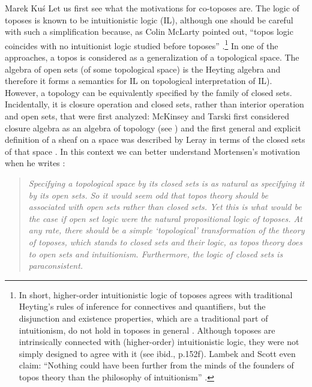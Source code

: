\begin{artengenv}{Marek Ku\'s}
Let us first see what the motivations for co-toposes are. The logic of toposes is known to be intuitionistic logic (\textsf{IL}), although one should be careful with such a simplification because, as Colin McLarty pointed out, ``topos logic coincides with no intuitionist logic studied before toposes''  \parencite[see][p.vii]{mclarty-1995}.\footnote{In short, higher-order intuitionistic logic of toposes agrees with traditional Heyting's rules of inference for connectives and quantifiers, but the disjunction and existence properties, which are a traditional part of intuitionism, do not hold in toposes in general \parencite[see][p.154]{mclarty-review-1990}. Although toposes are intrinsically connected with (higher-order) intuitionistic logic, they were not simply designed to agree with it (see ibid., p.152f). Lambek and Scott even claim: ``Nothing could have been further from the minds of the founders of topos theory than the philosophy of intuitionism'' \parencite[see][p.125]{lambek-scott}.} In one of the approaches, a topos is considered as a generalization of a topological space. The algebra of open sets (of some topological space) is the Heyting algebra and therefore it forms a semantics for \textsf{IL} \parencite[cf.][]{stone-1937, tarski-1938} on topological interpretation of \textsf{IL}). However, a topology can be equivalently specified by the family of closed sets. Incidentally, it is closure operation and closed sets, rather than interior operation and open sets, that were first analyzed: McKinsey and Tarski first considered closure algebra as an algebra of topology (see \parencite{mckinsey-tarski-1944, mckinsey-tarski-1946}) and the first general and explicit definition of a sheaf on a space was described by Leray in terms of the closed sets of that space  \parencite[cf.][p.1]{maclane-moerdijk-1994}. In this context we can better understand Mortensen's motivation when he writes \parencite[see][p.102]{mortensen-1995}:
\begin{quotation}
	\textit{Specifying a topological space by its closed sets is as natural as specifying it by its open sets. So it would seem odd that topos theory should be associated with open sets rather than closed sets. Yet this is what would be the case if open set logic were the natural propositional logic of toposes. At any rate, there should be a simple ‘topological’ transformation of the theory of toposes, which stands to closed sets and their logic, as topos theory does to open sets and intuitionism. Furthermore, the logic of closed sets is paraconsistent.}
\end{quotation}


\end{artengenv}
